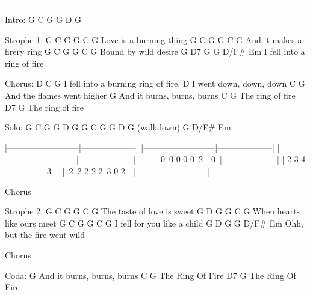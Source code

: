 \noindent\rule{\columnwidth}{1pt}

\begin{multicols}{2}
\begin{lstsong}
Intro: G C G G D G

Strophe 1:
G         C       G      G C G
Love is a burning thing
    G          C      G  G C G
And it makes a firery ring
G        C    G          G C G
Bound by wild desire
G             D7      G   G D/F# Em
I fell into a ring of fire

Chorus:
D             C               G
I fell into a burning ring of fire,
       D
I went down, down, down
        C           G
And the flames went higher
       G
And it burns, burns, burns
    C       G
The ring of fire
    D7      G
The ring of fire

Solo:
G C G G D G
G C G G D G
            (walkdown)
            G D/F# Em
\end{lstsong}
\begin{lsttab}
|--------------------------|--------------------|
|--------------------------|--------------------|
|--------------------------|--------------------|
|-------0--0-0-0-0--2---0--|--------------------|
|-2-3-4---------------3----|--2--2-2-2-2--3-0-2-|
|--------------------------|--------------------|
\end{lsttab}
\columnbreak
\begin{lstsong}
Chorus

Strophe 2:
G            C       G   G C G
The taste of love is sweet
G                D    G  G C G
When hearts like ours meet
G              C      G  G C G
I fell for you like a child
G            D         G  G D/F# Em
Ohh, but the fire went wild

Chorus

Coda:
G
And it burns, burns, burns
    C       G
The Ring Of Fire
    D7      G
The Ring Of Fire
\end{lstsong}
\begin{comment}
\begin{lsttab}
Solo:
|--------------------------|--------------------|
|--------------------------|--------------------|
|--------------------------|--------------------|
|-------0--0-0-0-0--2---0--|--------------------|
|-2-3-4---------------3----|--2--2-2-2-2--3-0-2-|
|--------------------------|--------------------|
\end{lsttab}
\end{comment}
\end{multicols}
\newpage

